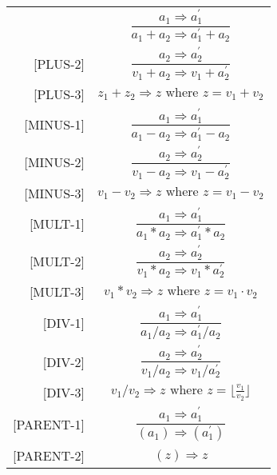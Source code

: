 \begin{table}[H]
    \centering
    \begin{longtable}[c] { r c }
        \hline
        [PLUS-1] & \( \dfrac{a_1 \Rightarrow a^{'}_{1}}{a_1 + a_2 \Rightarrow a^{'}_{1} + a_2} \) \\
        
        [PLUS-2] & \( \dfrac{a_2 \Rightarrow a^{'}_{2}}{v_1 + a_2 \Rightarrow v_1 + a^{'}_{2}} \) \\
        
        [PLUS-3] & \(z_1 + z_2 \Rightarrow z \text{ where } z = v_1 + v_2\) \\
        
        [MINUS-1] & \( \dfrac{a_1 \Rightarrow a^{'}_{1}}{a_1 - a_2 \Rightarrow a^{'}_{1} - a_2} \) \\
        
        [MINUS-2] & \( \dfrac{a_2 \Rightarrow a^{'}_{2}}{v_1 - a_2 \Rightarrow v_1 - a^{'}_{2}} \) \\
        
        [MINUS-3] & \(v_1 - v_2 \Rightarrow z \text{ where } z = v_1 - v_2\) \\
        
        [MULT-1] & \( \dfrac{a_1 \Rightarrow a^{'}_{1}}{a_1 * a_2 \Rightarrow a^{'}_{1} * a_2} \) \\
        
        [MULT-2] & \( \dfrac{a_2 \Rightarrow a^{'}_{2}}{v_1 * a_2 \Rightarrow v_1 * a^{'}_{2}} \) \\
        
        [MULT-3] & \(v_1 * v_2 \Rightarrow z \text{ where } z = v_1 \cdot v_2\) \\
        
        [DIV-1] & \( \dfrac{a_1 \Rightarrow a^{'}_{1}}{a_1 / a_2 \Rightarrow a^{'}_{1} / a_2} \) \\
        
        [DIV-2] & \( \dfrac{a_2 \Rightarrow a^{'}_{2}}{v_1 / a_2 \Rightarrow v_1 / a^{'}_{2}} \) \\
        
        [DIV-3] & \(v_1 / v_2 \Rightarrow z \text{ where } z = \lfloor\frac{v_1} {v_2}\rfloor\) \\
        
        [PARENT-1] & \( \dfrac{a_1 \Rightarrow a^{'}_{1}}{(a_1) \Rightarrow (a^{'}_{1})} \) \\
        
        [PARENT-2] & \( (z) \Rightarrow z \) \\
        

\end{longtable}
\end{table}
